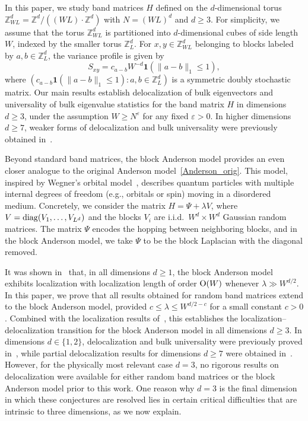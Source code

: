 In this paper, we study band matrices $H$ defined on the $d$-dimensional torus $\mathbb{Z}_{WL}^d=\mathbb{Z}^d / ((WL) \cdot \mathbb{Z}^d)$ with $N=(WL)^d$ and $d \geq 3$. For simplicity, we assume that the torus $\mathbb{Z}_{WL}^d$ is partitioned into $d$-dimensional cubes of side length $W$, indexed by the smaller torus ${\mathbb Z}_{L}^d$. For $x, y\in {\mathbb Z}_{WL}^d$ belonging to blocks labeled by $a, b \in {\mathbb Z}_L^d$, the variance profile is given by
\begin{equation}\label{eq:variance-profile}
S_{xy} = c_{a-b} W^{-d}  \mathbf{1}(\|a-b\|_1\le 1),
\end{equation}
where $(c_{a-b}\mathbf{1}(\|a-b\|_1\le 1):a, b \in {\mathbb Z}_L^d)$ is a symmetric doubly stochastic matrix. Our main results establish delocalization of bulk eigenvectors and universality of bulk eigenvalue statistics for the band matrix $H$ in dimensions $d \ge 3$, under the assumption $W \ge N^{\varepsilon}$ for any fixed $\varepsilon>0$. In higher dimensions $d \ge 7$, weaker forms of delocalization and bulk universality were previously obtained in~\cite{yang2021delocalization, yang2022delocalization, Xu:2024aa}.

Beyond standard band matrices, the block Anderson model provides an even closer analogue to the original Anderson model~\eqref{Anderson_orig}. This model, inspired by Wegner's orbital model~\cite{Wegner1, Wegner2, Wegner3}, describes quantum particles with multiple internal degrees of freedom (e.g., orbitals or spin) moving in a disordered medium. Concretely, we consider the matrix $H = \Psi + \lambda V$, where $V=\operatorname{diag}(V_1,\ldots, V_{L^d})$ and the blocks $V_i$ are i.i.d.~$W^d\times W^d$ Gaussian random matrices. The matrix $\Psi$ encodes the hopping between neighboring blocks, and in the block Anderson model, we take $\Psi$ to be the block Laplacian with the diagonal removed.

It was shown in~\cite{PelSchShaSod} that, in all dimensions $d \ge 1$, the block Anderson model exhibits localization with localization length of order $\operatorname{O}(W)$ whenever $\lambda \gg W^{d/2}$. In this paper, we prove that all results obtained for random band matrices extend to the block Anderson model, provided $c \le \lambda \le W^{d/2-c}$ for a small constant $c > 0$. Combined with the localization results of~\cite{PelSchShaSod}, this establishes the localization--delocalization transition for the block Anderson model in all dimensions $d \ge 3$. In dimensions $d\in\{1,2\}$, delocalization and bulk universality were previously proved in~\cite{RBSO1D}, while partial delocalization results for dimensions $d \ge 7$ were obtained in~\cite{yang2024Del}. 
However, for the physically most relevant case $d=3$, no rigorous results on delocalization were available for either random band matrices or the block Anderson model prior to this work. One reason why $d=3$ is the final dimension in which these conjectures are resolved lies in certain critical difficulties that are intrinsic to three dimensions, as we now explain.


